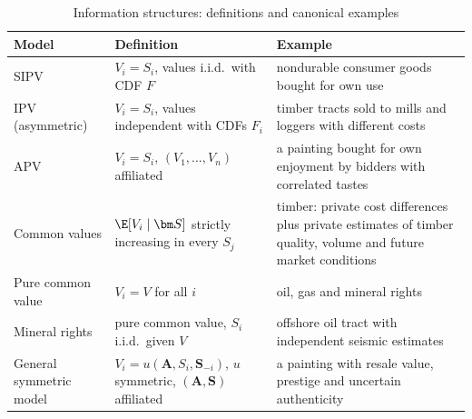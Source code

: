 \begin{table}[htbp]
\centering
\caption{Information structures: definitions and canonical examples}\label{tab:14-info}
\small
\begin{tabularx}{\textwidth}{@{}>{\raggedright\arraybackslash}p{2.9cm}>{\raggedright\arraybackslash}X>{\raggedright\arraybackslash}X@{}}
\toprule
Model & Definition & Example \\
\midrule
SIPV & $V_i=S_i$, values i.i.d.\ with CDF $F$ & nondurable consumer goods bought for own use
\citep[p.~1093]{MilgromWeber1982} \\
\addlinespace
IPV (asymmetric) & $V_i=S_i$, values independent with CDFs $F_i$ & timber tracts sold to mills and loggers with
different costs \citep{AtheyLevinSeira2011} \\
\addlinespace
APV & $V_i=S_i$, $(V_1,\dots,V_n)$ affiliated & a painting bought for own enjoyment by bidders with correlated
tastes \citep[p.~1099]{MilgromWeber1982} \\
\addlinespace
Common values & $\E[V_i\mid\bm S]$ strictly increasing in every $S_j$ & timber: private cost differences
plus private estimates of timber quality, volume and future market conditions
\citep[Section~II.F]{AtheyLevinSeira2011} \\
\addlinespace
Pure common value & $V_i=V$ for all $i$ & oil, gas and mineral rights \citep[Section~2.2]{MilgromWeber1982} \\
\addlinespace
Mineral rights & pure common value, $S_i$ i.i.d.\ given $V$ & offshore oil tract with independent seismic
estimates \citep[p.~1094]{MilgromWeber1982} \\
\addlinespace
General symmetric model & $V_i=u(\bm A,S_i,\bm S_{-i})$, $u$ symmetric, $(\bm A,\bm S)$ affiliated & a painting
with resale value, prestige and uncertain authenticity \citep[Section~2.3]{MilgromWeber1982} \\
\bottomrule
\end{tabularx}
\end{table}

